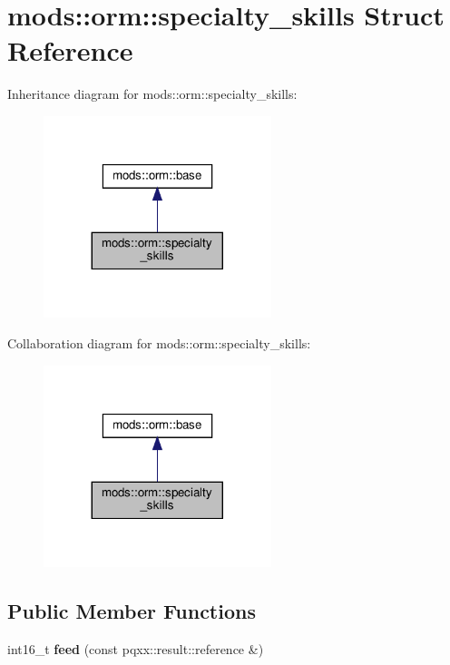 \hypertarget{structmods_1_1orm_1_1specialty__skills}{}\section{mods\+:\+:orm\+:\+:specialty\+\_\+skills Struct Reference}
\label{structmods_1_1orm_1_1specialty__skills}


Inheritance diagram for mods\+:\+:orm\+:\+:specialty\+\_\+skills\+:
\nopagebreak
\begin{figure}[H]
\begin{center}
\leavevmode
\includegraphics[width=188pt]{structmods_1_1orm_1_1specialty__skills__inherit__graph}
\end{center}
\end{figure}


Collaboration diagram for mods\+:\+:orm\+:\+:specialty\+\_\+skills\+:
\nopagebreak
\begin{figure}[H]
\begin{center}
\leavevmode
\includegraphics[width=188pt]{structmods_1_1orm_1_1specialty__skills__coll__graph}
\end{center}
\end{figure}
\subsection*{Public Member Functions}
\begin{DoxyCompactItemize}
\item 
\mbox{\label{structmods_1_1orm_1_1specialty__skills_af7858364fe2a287791b7257aecc99013}} 
int16\+\_\+t {\bfseries feed} (const pqxx\+::result\+::reference \&)
\end{DoxyCompactItemize}
